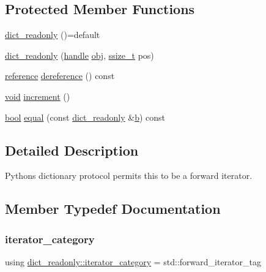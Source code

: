 \subsection*{Protected Member Functions}
\begin{DoxyCompactItemize}
\item 
\mbox{\hyperlink{classdict__readonly_a52c3ca198cb013e3ba952950d6ee95de}{dict\+\_\+readonly}} ()=default
\item 
\mbox{\hyperlink{classdict__readonly_a53cb6c65507a2455c3eff4e3e43cc048}{dict\+\_\+readonly}} (\mbox{\hyperlink{classhandle}{handle}} \mbox{\hyperlink{_s_d_l__opengl__glext_8h_a0c0d4701a6c89f4f7f0640715d27ab26}{obj}}, \mbox{\hyperlink{detail_2common_8h_ac430d16fc097b3bf0a7469cfd09decda}{ssize\+\_\+t}} pos)
\item 
\mbox{\hyperlink{classdict__readonly_a84d59082eaadc1ea6eb819992cc74f0e}{reference}} \mbox{\hyperlink{classdict__readonly_a28eef7ab54bace49d245676429d91830}{dereference}} () const
\item 
\mbox{\hyperlink{_s_d_l__opengles2__gl2ext_8h_ae5d8fa23ad07c48bb609509eae494c95}{void}} \mbox{\hyperlink{classdict__readonly_aed97e06f8d73b62e2af0d9034d0459cb}{increment}} ()
\item 
\mbox{\hyperlink{asdl_8h_af6a258d8f3ee5206d682d799316314b1}{bool}} \mbox{\hyperlink{classdict__readonly_a5190cd6607fe555c164fcc104903d11c}{equal}} (const \mbox{\hyperlink{classdict__readonly}{dict\+\_\+readonly}} \&\mbox{\hyperlink{_s_d_l__opengl__glext_8h_a0f71581a41fd2264c8944126dabbd010}{b}}) const
\end{DoxyCompactItemize}


\subsection{Detailed Description}
Python\textquotesingle{}s dictionary protocol permits this to be a forward iterator. 

\subsection{Member Typedef Documentation}
\mbox{\label{classdict__readonly_a03ca5952047f74c722d9a9a7b7170518}} 
\subsubsection{\texorpdfstring{iterator\_category}{iterator\_category}}
{\footnotesize\ttfamily using \mbox{\hyperlink{classdict__readonly_a03ca5952047f74c722d9a9a7b7170518}{dict\+\_\+readonly\+::iterator\+\_\+category}} =  std\+::forward\+\_\+iterator\+\_\+tag\hspace{0.3cm}{\ttfamily [protected]}}

